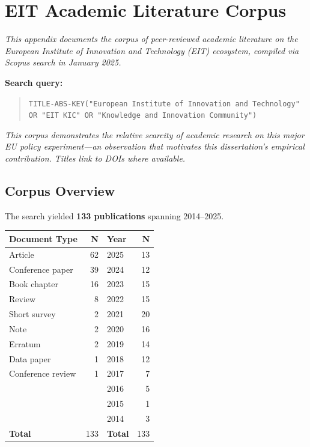 \chapter{EIT Academic Literature Corpus}
\label{app:eit-literature}

\noindent\textit{This appendix documents the corpus of peer-reviewed academic literature on the European Institute of Innovation and Technology (EIT) ecosystem, compiled via Scopus search in January 2025.}

\smallskip

\noindent\textbf{Search query:}
\begin{quote}
\small\texttt{TITLE-ABS-KEY("European Institute of Innovation and Technology" OR "EIT KIC" OR "Knowledge and Innovation Community")}
\end{quote}

\noindent\textit{This corpus demonstrates the relative scarcity of academic research on this major EU policy experiment---an observation that motivates this dissertation's empirical contribution. Titles link to DOIs where available.}

\bigskip

\section{Corpus Overview}

The search yielded \textbf{133 publications} spanning 2014--2025.

\begin{center}
\small
\begin{tabular}{@{}lr|lr@{}}
\toprule
\textbf{Document Type} & \textbf{N} & \textbf{Year} & \textbf{N} \\
\midrule
Article & 62 & 2025 & 13 \\
Conference paper & 39 & 2024 & 12 \\
Book chapter & 16 & 2023 & 15 \\
Review & 8 & 2022 & 15 \\
Short survey & 2 & 2021 & 20 \\
Note & 2 & 2020 & 16 \\
Erratum & 2 & 2019 & 14 \\
Data paper & 1 & 2018 & 12 \\
Conference review & 1 & 2017 & 7 \\
 & & 2016 & 5 \\
 & & 2015 & 1 \\
 & & 2014 & 3 \\
\midrule
\textbf{Total} & 133 & \textbf{Total} & 133 \\
\bottomrule
\end{tabular}
\label{tab:eit-lit-overview}
\end{center}


